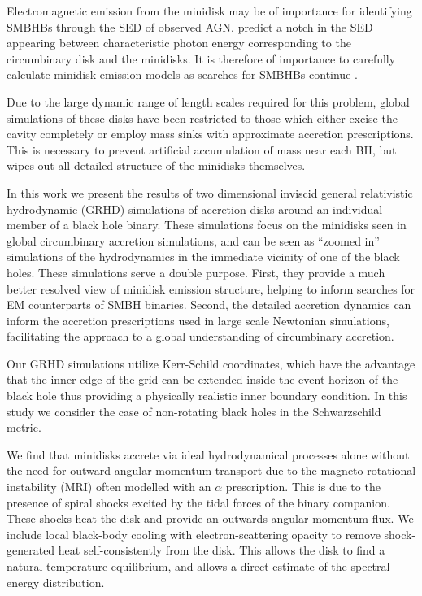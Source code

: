 \documentclass{emulateapj}
\begin{document}
Electromagnetic emission from the minidisk may be of importance for identifying SMBHBs through the SED of observed AGN. \cite{Roedig14} predict a notch in the SED appearing between characteristic photon energy corresponding to the circumbinary disk and the minidisks. It is therefore of importance to carefully calculate minidisk emission models as searches for SMBHBs continue \citep{Runnoe15,Li16,Charisi16}.

Due to the large dynamic range of length scales required for this problem, global simulations of these disks have been restricted to those which either excise the cavity completely or employ mass sinks with approximate accretion prescriptions.  This is necessary to prevent artificial accumulation of mass near each BH, but wipes out all detailed structure of the minidisks themselves.

In this work we present the results of two dimensional inviscid general relativistic hydrodynamic (GRHD) simulations of accretion disks around an individual member of a black hole binary. These simulations focus on the minidisks seen in global circumbinary accretion simulations, and can be seen as ``zoomed in'' simulations of the hydrodynamics in the immediate vicinity of one of the black holes.  These simulations serve a double purpose. First, they provide a much better resolved view of minidisk emission structure, helping to inform searches for EM counterparts of SMBH binaries.  Second, the detailed accretion dynamics can inform the accretion prescriptions used in large scale Newtonian simulations, facilitating the approach to a global understanding of circumbinary accretion.

Our GRHD simulations utilize Kerr-Schild coordinates, which have the advantage that the inner edge of the grid can be extended inside the event horizon of the black hole thus providing a physically realistic inner boundary condition. In this study we consider the case of non-rotating black holes in the Schwarzschild metric.

  We find that minidisks accrete via ideal hydrodynamical processes alone without the need for outward angular momentum transport due to the magneto-rotational instability (MRI) often modelled with an $\alpha$ prescription.
This is due to the presence of spiral shocks excited by the tidal forces of the binary companion. These shocks heat the disk and provide an outwards angular momentum flux. We include local 
black-body cooling with electron-scattering opacity to remove shock-generated
heat self-consistently from the disk.  This allows the disk to find a natural
temperature equilibrium, and allows a direct estimate of the spectral energy distribution.
\end{document}
